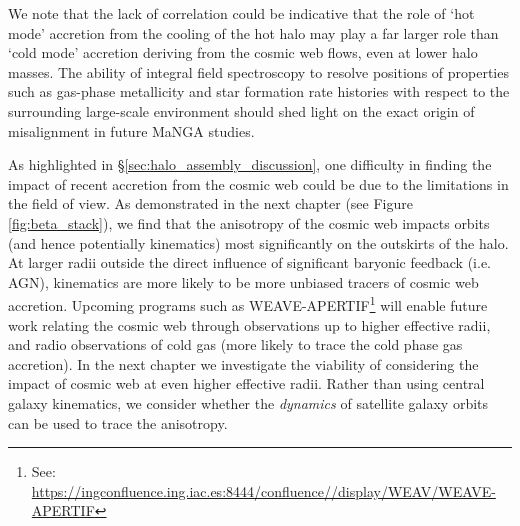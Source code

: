 We note that the lack of correlation could be indicative that the role of `hot mode' accretion from the cooling of the hot halo may play a far larger role than `cold mode' accretion deriving from the cosmic web flows, even at lower halo masses. The ability of integral field spectroscopy to resolve positions of properties such as gas-phase metallicity and star formation rate histories with respect to the surrounding large-scale environment should shed light on the exact origin of misalignment in future MaNGA studies. 

As highlighted in \S\ref{sec:halo_assembly_discussion}, one difficulty in finding the impact of recent accretion from the cosmic web could be due to the limitations in the field of view. As demonstrated in the next chapter (see Figure \ref{fig:beta_stack}), we find that the anisotropy of the cosmic web impacts orbits (and hence potentially kinematics) most significantly on the outskirts of the halo. At larger radii outside the direct influence of significant baryonic feedback (i.e. AGN), kinematics are more likely to be more unbiased tracers of cosmic web accretion. Upcoming programs such as WEAVE-APERTIF\footnote{See: \url{https://ingconfluence.ing.iac.es:8444/confluence//display/WEAV/WEAVE-APERTIF}} will enable future work relating the cosmic web through observations up to higher effective radii, and radio observations of cold gas (more likely to trace the cold phase gas accretion). In the next chapter we investigate the viability of considering the impact of cosmic web at even higher effective radii. Rather than using central galaxy kinematics, we consider whether the \textit{dynamics} of satellite galaxy orbits can be used to trace the anisotropy. 